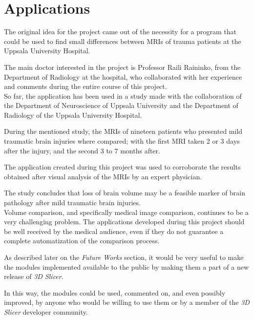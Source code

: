 \chapter{Applications}

The original idea for the project came out of the necessity for a
program that could be used to find small differences between MRIs of
trauma patients at the Uppsala University Hospital.

The main doctor interested in the project is Professor Raili Raininko, from
the Department of Radiology at the hospital, who collaborated with her
experience and comments during the entire course of this project.\\

So far, the application has been used in a study made with the
collaboration of the Department of Neuroscience of Uppsala University
and the Department of Radiology of the Uppsala University Hospital.

During the mentioned study, the MRIs of nineteen patients who
presented mild traumatic brain injuries where compared; with the first
MRI taken 2 or 3 days after the injury, and the second 3 to 7 months
after.

The application created during this project was used to corroborate
the results obtained after visual analysis of the MRIs by an expert
physician. 

The study concludes that loss of brain volume may be a
feasible marker of brain pathology after mild traumatic brain
injuries.\\

Volume comparison, and specifically medical image comparison,
continues to be a very challenging problem. The applications developed
during this project should be well received by the medical audience,
even if they do not guarantee a complete automatization of the
comparison process.

As described later on the \textit{Future Works} section, it would be
very useful to make the modules implemented available to the public by
making them a part of a new release of \textit{3D Slicer}.

In this way, the modules could be used, commented on, and even
possibly improved, by anyone who would be willing to use them or by a
member of the \textit{3D Slicer} developer community.


